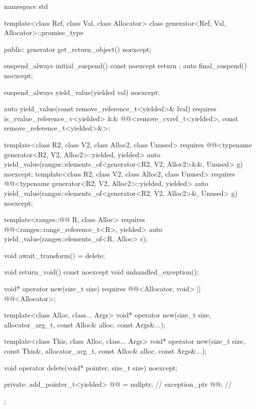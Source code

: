 \begin{codeblock}
namespace std {
  template<class Ref, class Val, class Allocator>
  class generator<Ref, Val, Allocator>::promise_type {
  public:
    generator get_return_object() noexcept;

    suspend_always initial_suspend() const noexcept { return {}; }
    auto final_suspend() noexcept;

    suspend_always yield_value(yielded val) noexcept;

    auto yield_value(const remove_reference_t<yielded>& lval)
      requires is_rvalue_reference_v<yielded> &&
        @@<remove_cvref_t<yielded>, const remove_reference_t<yielded>&>;

    template<class R2, class V2, class Alloc2, class Unused>
      requires @@<typename generator<R2, V2, Alloc2>::yielded, yielded>
        auto yield_value(ranges::elements_of<generator<R2, V2, Alloc2>&&, Unused> g) noexcept;
    template<class R2, class V2, class Alloc2, class Unused>
      requires @@<typename generator<R2, V2, Alloc2>::yielded, yielded>
        auto yield_value(ranges::elements_of<generator<R2, V2, Alloc2>&, Unused> g) noexcept;

    template<ranges::@@ R, class Alloc>
      requires @@<ranges::range_reference_t<R>, yielded>
        auto yield_value(ranges::elements_of<R, Alloc> r);

    void await_transform() = delete;

    void return_void() const noexcept {}
    void unhandled_exception();

    void* operator new(size_t size)
      requires @@<Allocator, void> || @@<Allocator>;

    template<class Alloc, class... Args>
      void* operator new(size_t size, allocator_arg_t, const Alloc& alloc, const Args&...);

    template<class This, class Alloc, class... Args>
      void* operator new(size_t size, const This&, allocator_arg_t, const Alloc& alloc,
                         const Args&...);

    void operator delete(void* pointer, size_t size) noexcept;

  private:
    add_pointer_t<yielded> @@ = nullptr;    // \expos
    exception_ptr @@;                      // \expos
  };
}
\end{codeblock}

